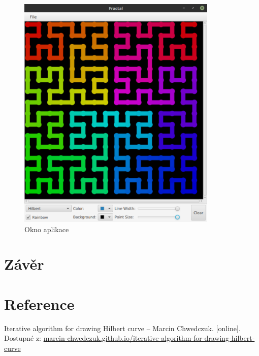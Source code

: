 \documentclass[12pt]{scrartcl}
\begin{document}
\begin{figure}[!ht]
	\centering
	\includegraphics[width=0.85\textwidth,natwidth=1,natheight=1]{app_gui.pdf}
	\caption{Okno aplikace}
\end{figure}

\newpage
\section{Závěr}
\paragraph{}


\section{Reference}
Iterative algorithm for drawing Hilbert curve – Marcin Chwedczuk. [online].\\ Dostupné z: \href{https://marcin-chwedczuk.github.io/iterative-algorithm-for-drawing-hilbert-curve}{marcin-chwedczuk.github.io/iterative-algorithm-for-drawing-hilbert-curve}
\end{document}

